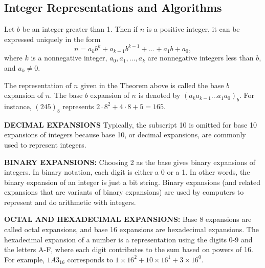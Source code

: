 \subsection{Integer Representations and Algorithms}
\begin{thm}
Let \(b\) be an integer greater than 1. Then if \(n\) is a positive integer, it can be expressed uniquely in the form
\[n = a_k b^k + a_{k-1} b^{k-1} + \ldots + a_1 b + a_0,\]
where \(k\) is a nonnegative integer, \(a_0, a_1, \ldots, a_k\) are nonnegative integers less than \(b\), and \(a_k \neq 0\).
\end{thm}
\begin{defn}
The representation of \(n\) given in the Theorem above is called the base \(b\) expansion of \(n\). The base \(b\) expansion of \(n\) is denoted by \((a_k a_{k-1} \ldots a_1a_0)_b\). For instance, \((245)_8\) represents \(2 \cdot 8^2 + 4 \cdot 8 + 5 = 165\). 

\textbf{DECIMAL EXPANSIONS} Typically, the subscript 10 is omitted for base 10 expansions of integers because base 10, or decimal expansions, are commonly used to represent integers.

\textbf{BINARY EXPANSIONS:} Choosing 2 as the base gives binary expansions of integers. In binary notation, each digit is either a 0 or a 1. In other words, the binary expansion of an integer is just a bit string. Binary expansions (and related expansions that are variants of binary expansions) are used by computers to represent and do arithmetic with integers.

\textbf{OCTAL AND HEXADECIMAL EXPANSIONS:} Base 8 expansions are called octal expansions, and base 16 expansions are hexadecimal expansions.
The hexadecimal expansion of a number is a representation using the digits 0-9 and the letters A-F, where each digit contributes to the sum based on powers of 16. For example, $1A3_{16}$ corresponds to $1 \times 16^2 + 10 \times 16^1 + 3 \times 16^0$.

\end{defn}

